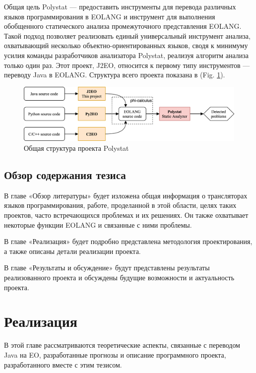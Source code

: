 \documentclass[oneside,final,14pt,a4paper]{extreport}
\theoremstyle{definition}
\theoremstyle{remark}
\theoremstyle{remark}
\newcommand\pic[1]{(Fig. \ref{#1})} %
\begin{document}
Общая цель Polystat — предоставить инструменты для перевода различных языков программирования в EOLANG и инструмент для выполнения обобщенного статического анализа промежуточного представления EOLANG. Такой подход позволяет реализовать единый универсальный инструмент анализа, охватывающий несколько объектно-ориентированных языков, сводя к минимуму усилия команды разработчиков анализатора Polystat, реализуя алгоритм анализа только один раз. Этот проект, J2EO, относится к первому типу инструментов — переводу Java в EOLANG. Структура всего проекта показана в \pic{fig:polystat_structure}.

\begin{figure}[H]
    \includegraphics[width=1\textwidth]{polystat_structure.png}
    \centering
    \caption{Общая структура проекта Polystat}
    \label{fig:polystat_structure}
\end{figure}


\section{Обзор содержания тезиса}

В главе «Обзор литературы» будет изложена общая информация о трансляторах языков программирования, работе, проделанной в этой области, целях таких проектов, часто встречающихся проблемах и их решениях. Он также охватывает некоторые функции EOLANG и связанные с ними проблемы.

В главе «Реализация» будет подробно представлена ​​методология проектирования, а также описаны детали реализации проекта.

В главе «Результаты и обсуждение» будут представлены результаты реализованного проекта и обсуждены будущие возможности и актуальность проекта.


\chapter{Реализация}
\label{chapter:implementation}

В этой главе рассматриваются теоретические аспекты, связанные с переводом Java на EO, разработанные прогнозы и описание программного проекта, разработанного вместе с этим тезисом.
\end{document}
